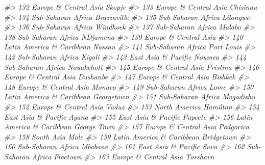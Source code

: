 \documentclass[
  xelatex, ja=standard]{bxjsbook}
\newenvironment{Shaded}{\begin{snugshade}}{\end{snugshade}}
\newcommand{\CommentTok}[1]{\textcolor[rgb]{0.56,0.35,0.01}{\textit{#1}}}
\theoremstyle{definition}
\theoremstyle{definition}
\theoremstyle{definition}
\theoremstyle{definition}
\theoremstyle{remark}
\begin{document}
\begin{Shaded}
\begin{Highlighting}[]
\CommentTok{\#\textgreater{} 132      Europe \& Central Asia              Skopje}
\CommentTok{\#\textgreater{} 133      Europe \& Central Asia            Chisinau}
\CommentTok{\#\textgreater{} 134         Sub{-}Saharan Africa         Brazzaville}
\CommentTok{\#\textgreater{} 135         Sub{-}Saharan Africa            Lilongwe}
\CommentTok{\#\textgreater{} 136         Sub{-}Saharan Africa            Windhoek}
\CommentTok{\#\textgreater{} 137         Sub{-}Saharan Africa              Malabo}
\CommentTok{\#\textgreater{} 138         Sub{-}Saharan Africa           N\textquotesingle{}Djamena}
\CommentTok{\#\textgreater{} 139      Europe \& Central Asia                    }
\CommentTok{\#\textgreater{} 140  Latin America \& Caribbean              Nassau}
\CommentTok{\#\textgreater{} 141         Sub{-}Saharan Africa          Port Louis}
\CommentTok{\#\textgreater{} 142         Sub{-}Saharan Africa              Kigali}
\CommentTok{\#\textgreater{} 143        East Asia \& Pacific             Noum\textquotesingle{}ea}
\CommentTok{\#\textgreater{} 144         Sub{-}Saharan Africa          Nouakchott}
\CommentTok{\#\textgreater{} 145      Europe \& Central Asia            Pristina}
\CommentTok{\#\textgreater{} 146      Europe \& Central Asia            Dushanbe}
\CommentTok{\#\textgreater{} 147      Europe \& Central Asia             Bishkek}
\CommentTok{\#\textgreater{} 148      Europe \& Central Asia              Monaco}
\CommentTok{\#\textgreater{} 149         Sub{-}Saharan Africa                Lome}
\CommentTok{\#\textgreater{} 150  Latin America \& Caribbean          Georgetown}
\CommentTok{\#\textgreater{} 151         Sub{-}Saharan Africa           Mogadishu}
\CommentTok{\#\textgreater{} 152      Europe \& Central Asia               Vaduz}
\CommentTok{\#\textgreater{} 153              North America            Hamilton}
\CommentTok{\#\textgreater{} 154        East Asia \& Pacific               Agana}
\CommentTok{\#\textgreater{} 155        East Asia \& Pacific             Papeete}
\CommentTok{\#\textgreater{} 156  Latin America \& Caribbean         George Town}
\CommentTok{\#\textgreater{} 157      Europe \& Central Asia           Podgorica}
\CommentTok{\#\textgreater{} 158                 South Asia                Male}
\CommentTok{\#\textgreater{} 159  Latin America \& Caribbean          Bridgetown}
\CommentTok{\#\textgreater{} 160         Sub{-}Saharan Africa             Mbabane}
\CommentTok{\#\textgreater{} 161        East Asia \& Pacific                Suva}
\CommentTok{\#\textgreater{} 162         Sub{-}Saharan Africa            Freetown}
\CommentTok{\#\textgreater{} 163      Europe \& Central Asia            Torshavn}

\end{Highlighting}
\end{Shaded}
\end{document}
